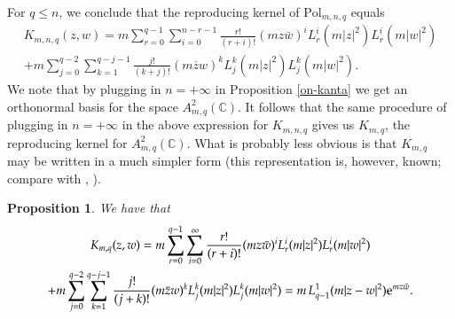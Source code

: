 \documentclass{birkart}
\newtheorem{prop}[thm]{Proposition}
\theoremstyle{definition}
\theoremstyle{remark}
\numberwithin{equation}{section}
\numberwithin{figure}{section}
\newcommand{\e}{\mathrm e}
\newcommand{\1}{{\mathbf 1}}
\newcommand{\Rpar}{q}
\newcommand{\C}{{\mathbb C}}
\begin{document}
For $\Rpar\leq n$, we conclude that the reproducing kernel of 
$\mathrm{Pol}_{m,n,\Rpar}$ equals 
\begin{multline}
\label{eq-Kmnq}
K_{m,n,\Rpar} (z,w) = m\sum_{r=0}^{\Rpar-1} 
\sum_{i=0}^{n-r-1} \frac{r!}{(r+i)!} 
(mz\bar{w})^i L_r^{i}(m|z|^2)L_r^{i}(m|w|^2) 
\\
+ m\sum_{j=0}^{\Rpar-2}\sum_{k=1}^{\Rpar-j-1} \frac{j!}{(k+j)!} 
(m\overline{z}w)^k L^{k}_{j}(m|z|^2)L^{k}_{j}(m|w|^2).
\end{multline}
We note that by plugging in $n=+\infty$ in Proposition \ref{on-kanta}
we get an orthonormal basis for the space $A^2_{m,\Rpar}(\C)$. 
It follows that the same procedure of plugging in $n=+\infty$ in the 
above expression for $K_{m,n,\Rpar}$ gives us $K_{m,\Rpar}$, the reproducing 
kernel for $A^2_{m,\Rpar}(\C)$.  What is probably less obvious is that 
$K_{m,\Rpar}$ may be written in a much simpler form (this representation is,
however, known; compare with \cite{AIM}, \cite{Mou}).

\begin{prop}
\label{prop-repkern}
We have that
\begin{multline*}
K_{m,\Rpar} (z,w) = m\sum_{r=0}^{\Rpar-1}\sum_{i=0}^{\infty} 
\frac{r!}{(r+i)!}(mz \bar{w})^i L_r^{i}(m|z|^2)L_r^{i}(m|w|^2) \notag 
\\
+m\sum_{j=0}^{\Rpar-2} \sum_{k=1}^{\Rpar-j-1} \frac{j!}{(j+k)!} 
(m\bar{z}w)^k L^{k}_{j}(m|z|^2)L^{k}_{j}(m|w|^2) \notag 
=m\,L^{1}_{\Rpar-1}(m|z-w|^2)\e^{m z \bar{w}}.\notag
\end{multline*}
\end{prop}
\end{document}
